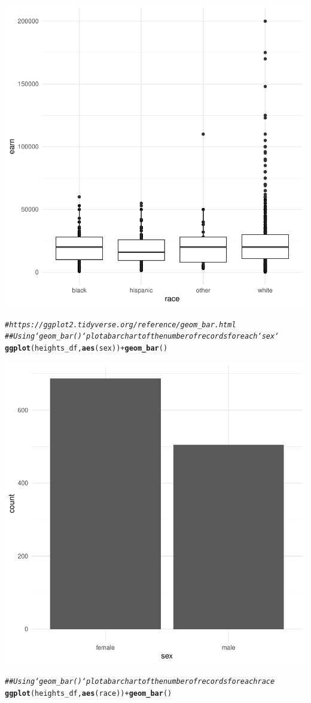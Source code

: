 \documentclass{article}\usepackage[]{graphicx}\usepackage[]{xcolor}
\makeatletter
\newcommand{\hlcom}[1]{\textcolor[rgb]{0.678,0.584,0.686}{\textit{#1}}}%
\newcommand{\hlopt}[1]{\textcolor[rgb]{0,0,0}{#1}}%
\newcommand{\hlstd}[1]{\textcolor[rgb]{0.345,0.345,0.345}{#1}}%
\newcommand{\hlkwd}[1]{\textcolor[rgb]{0.737,0.353,0.396}{\textbf{#1}}}%
\newenvironment{kframe}{%
 \def\at@end@of@kframe{}%
 \ifinner\ifhmode%
  \def\at@end@of@kframe{\end{minipage}}%
  \begin{minipage}{\columnwidth}%
 \fi\fi%
 \def\FrameCommand##1{\hskip\@totalleftmargin \hskip-\fboxsep
 \colorbox{shadecolor}{##1}\hskip-\fboxsep
     \hskip-\linewidth \hskip-\@totalleftmargin \hskip\columnwidth}%
 \MakeFramed {\advance\hsize-\width
   \@totalleftmargin\z@ \linewidth\hsize
   \@setminipage}}%
 {\par\unskip\endMakeFramed%
 \at@end@of@kframe}
\newenvironment{knitrout}{}{} %
\makeatother
\begin{document}
\begin{knitrout}
{\centering \includegraphics[width=.6\linewidth]{figure/assignment-06-ReppetoBrian-Rnwauto-report-2} 

}


\begin{kframe}\begin{alltt}
\hlcom{# https://ggplot2.tidyverse.org/reference/geom_bar.html}
\hlcom{## Using `geom_bar()` plot a bar chart of the number of records for each `sex`}
\hlkwd{ggplot}\hlstd{(heights_df,} \hlkwd{aes}\hlstd{(sex))} \hlopt{+} \hlkwd{geom_bar}\hlstd{()}
\end{alltt}
\end{kframe}

{\centering \includegraphics[width=.6\linewidth]{figure/assignment-06-ReppetoBrian-Rnwauto-report-3} 

}


\begin{kframe}\begin{alltt}
\hlcom{## Using `geom_bar()` plot a bar chart of the number of records for each race}
\hlkwd{ggplot}\hlstd{(heights_df,} \hlkwd{aes}\hlstd{(race))} \hlopt{+} \hlkwd{geom_bar}\hlstd{()}
\end{alltt}
\end{kframe}


\end{knitrout}
\end{document}
